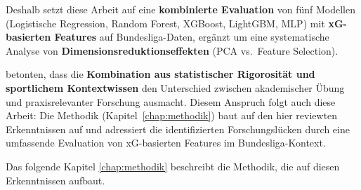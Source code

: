 Deshalb setzt diese Arbeit auf eine \textbf{kombinierte Evaluation} von fünf Modellen (Logistische Regression, Random Forest, XGBoost, LightGBM, MLP) mit \textbf{xG-basierten Features} auf Bundesliga-Daten, ergänzt um eine systematische Analyse von \textbf{Dimensionsreduktionseffekten} (PCA vs.\ Feature Selection).

\textcite{GrollLeyEffenberger2019} betonten, dass die \textbf{Kombination aus statistischer Rigorosität und sportlichem Kontextwissen} den Unterschied zwischen akademischer Übung und praxisrelevanter Forschung ausmacht. Diesem Anspruch folgt auch diese Arbeit: Die Methodik (Kapitel~\ref{chap:methodik}) baut auf den hier reviewten Erkenntnissen auf und adressiert die identifizierten Forschungslücken durch eine umfassende Evaluation von xG-basierten Features im Bundesliga-Kontext.

Das folgende Kapitel \ref{chap:methodik} beschreibt die Methodik, die auf diesen Erkenntnissen aufbaut.
